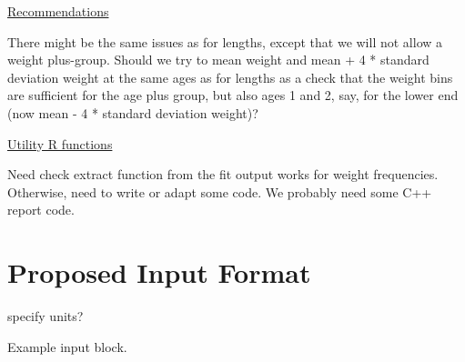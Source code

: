 \documentclass[a4paper,11pt,twoside,pdftex,draft]{article}
\begin{document}
\bigskip
\underline{Recommendations}

There might be the same issues as for lengths, except that we will not allow a weight plus-group. Should we try to mean weight and mean + 4 * standard deviation weight at the same ages as for lengths as a check that the weight bins are sufficient for the age plus group, but also ages 1 and 2, say, for the lower end (now mean - 4 * standard deviation weight)?

\bigskip
\underline{Utility R functions}

Need check extract function from the fit output works for weight frequencies. Otherwise, need to write or adapt some code. 
We probably need some C++ report code. 

\section{Proposed Input Format}

specify units?

Example input block.
\end{document}

